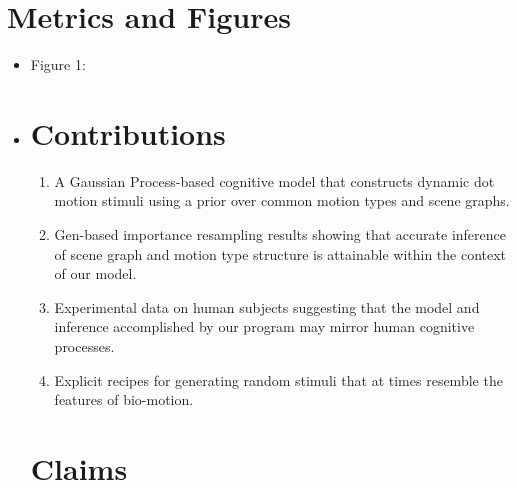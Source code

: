 \documentclass{scrartcl}
\begin{document}
\section*{Metrics and Figures}
\begin{itemize}
  \item Figure 1: 
  \item 


  
\section*{Contributions}

\begin{enumerate}
  \item A Gaussian Process-based cognitive model that constructs dynamic dot motion stimuli using a prior over common motion types and scene graphs. \cite{Saad_2019}
  \item Gen-based importance resampling results showing that accurate inference of scene graph and motion type structure is attainable within the context of our model. 
  \item Experimental data on human subjects suggesting that the model and inference accomplished by our program may mirror human cognitive processes.
  \item Explicit recipes for generating random stimuli that at times resemble the features of bio-motion.

\end{enumerate}    

\section*{Claims}

\begin{enumerate}


\end{enumerate}
\end{itemize}
\end{document}
